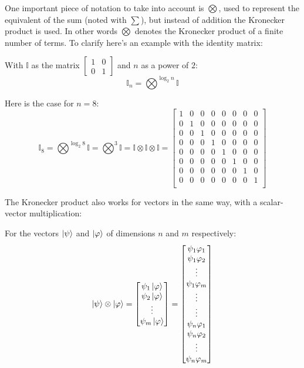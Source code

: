 One important piece of notation to take into account is $\bigotimes$, used to represent the equivalent of the sum (noted with $\sum$), but instead of addition the Kronecker product is used. In other words $\bigotimes$ denotes the Kronecker product of a finite number of terms. To clarify here's an example with the identity matrix:


With $\mathbb{I}$ as the matrix $\begin{bmatrix} 1 & 0 \\ 0 & 1 \end{bmatrix}$ and $n$ as a power of $2$:
$$
\mathbb{I}_n = \bigotimes^{\log_{2} n} \mathbb{I}  
$$
	
Here is the case for $n=8$: 
$$\mathbb{I}_8 =  \bigotimes^{\log_{2} 8} \mathbb{I} =\bigotimes^3 \mathbb{I} = \mathbb{I} \otimes \mathbb{I} \otimes \mathbb{I} =
	\begin{bmatrix}
		1 &0 &0 &0 &0 &0 &0 &0 \\
		0 &1 &0 &0 &0 &0 &0 &0 \\
		0 &0 &1 &0 &0 &0 &0 &0 \\
		0 &0 &0 &1 &0 &0 &0 &0 \\
		0 &0 &0 &0 &1 &0 &0 &0 \\
		0 &0 &0 &0 &0 &1 &0 &0 \\
		0 &0 &0 &0 &0 &0 &1 &0 \\
		0 &0 &0 &0 &0 &0 &0 &1 \\
	\end{bmatrix} 
$$


The Kronecker product also works for vectors in the same way, with a scalar-vector multiplication:

For the vectors $\ket{\psi}$ and $\ket{\varphi}$ of dimensions $n$ and $m$ respectively:
$$
\ket{\psi} \otimes \ket{\varphi} = \begin{bmatrix}
	\psi_{1} \ket{\varphi} \\
	\psi_2 \ket{\varphi} \\
	\vdots \\
	\psi_{m} \ket{\varphi}
\end{bmatrix} = 
\begin{bmatrix}
\psi_{1} \varphi_1 \\
\psi_{1} \varphi_{2} \\
\vdots \\
\psi_{1} \varphi_{m} \\
\vdots \\
\vdots \\
\psi_{n} \varphi_1 \\
\psi_{n} \varphi_{2} \\
\vdots \\
\psi_{n} \varphi_{m} \\
\end{bmatrix}
$$


